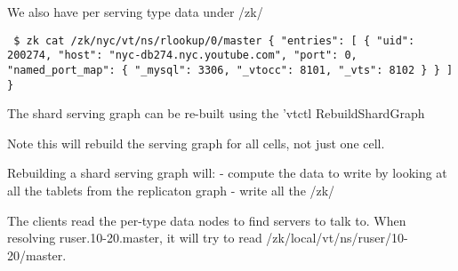 We also have per serving type data under /zk/

{\tt 
\$ zk cat /zk/nyc/vt/ns/rlookup/0/master
\{
  "entries": [
    \{
      "uid": 200274,
      "host": "nyc-db274.nyc.youtube.com",
      "port": 0,
      "named\_port\_map": \{
        "\_mysql": 3306,
        "\_vtocc": 8101,
        "\_vts": 8102
      \}
    \}
  ]
\}
}

The shard serving graph can be re-built using the 'vtctl RebuildShardGraph 

Note this will rebuild the serving graph for all cells, not just one cell.

Rebuilding a shard serving graph will:
- compute the data to write by looking at all the tablets from the replicaton graph
- write all the /zk/

The clients read the per-type data nodes to find servers to talk to. When resolving ruser.10-20.master, it will try to read /zk/local/vt/ns/ruser/10-20/master.

